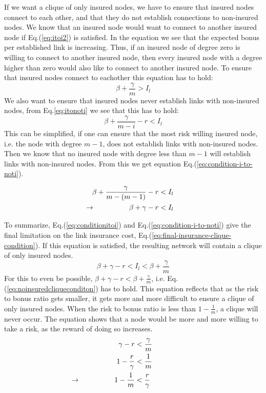 If we want a clique of only insured nodes, we have to ensure that insured nodes connect to each other, and that they do not establish connections to non-insured nodes.
We know that an insured node would want to connect to another insured node if  Eq.(\ref{eq:itoi2}) is satisfied. 
In the equation we see that the expected bonus per established link is increasing. Thus, if an insured node of degree zero is willing to connect to another insured node, then every insured node with a degree higher than zero would also like to connect to another insured node. To ensure that insured nodes connect to eachother this equation has to hold:
\begin{equation}
\beta+\frac{\gamma}{m}>I_{l}
\label{eq:conditionitoi}
\end{equation}
We also want to ensure that insured nodes never establish links with non-insured nodes, from Eq.\ref{eq:itonoti} we see that this has to hold:
\begin{equation}
\beta+\frac{\gamma}{m-i}-r < I_{l}
\label{eq:conditionitonoti}
\end{equation}
This can be simplified, if one can ensure that the most risk willing insured node, i.e. the node with degree $m-1$, does not establish links with non-insured nodes. Then we know that no insured node with degree less than $m-1$ will establish links with non-insured nodes. From this we get equation Eq.(\ref{eq:condition-i-to-noti}).

\begin{eqnarray}
\beta+\frac{\gamma}{m-(m-1)}-r&<I_{l} \nonumber\\
\llap{$\rightarrow$\hspace{50pt}} \beta+\gamma-r&<I_{l}
\label{eq:condition-i-to-noti}
\end{eqnarray}

To summarize, Eq.(\ref{eq:conditionitoi}) and Eq.(\ref{eq:condition-i-to-noti}) give the final limitation on the link insurance cost, Eq.(\ref{eq:final-insurance-clique-condition}). If this equation is satisfied, the resulting network will contain a clique of only insured nodes.
\begin{equation}
\beta+\gamma-r<I_{l}<\beta+\frac{\gamma}{m}
\label{eq:final-insurance-clique-condition}
\end{equation}
For this to even be possible, $\beta+\gamma-r<\beta+\frac{\gamma}{m}$, i.e. Eq.(\ref{eq:noinsuredcliqueconditon}) has to hold. This equation reflects that as the risk to bonus ratio gets smaller, it gets more and more difficult to ensure a clique of only insured nodes. When the risk to bonus ratio is less than $1-\frac{1}{m}$, a clique will never occur. The equation shows that a node would be more and more willing to take a risk, as the reward of doing so increases.
\begin{eqnarray}
\gamma-r &<\frac{\gamma}{m}\nonumber \\
1-\frac{r}{\gamma}&<\frac{1}{m} \nonumber \\
\llap{$\rightarrow$\hspace{50pt}}1-\frac{1}{m}&<\frac{r}{\gamma}
\label{eq:noinsuredcliqueconditon}
\end{eqnarray}

